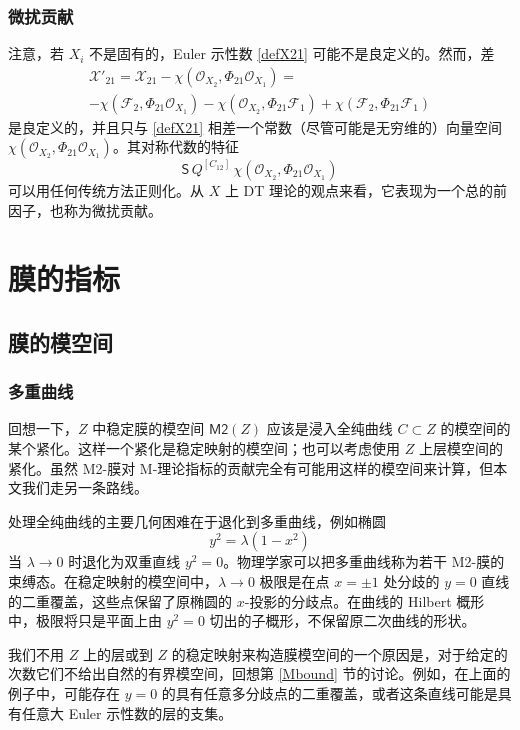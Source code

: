 \documentclass[12pt]{article}
\newcommand{\cO}{\mathscr{O}}
\newcommand{\cF}{\mathscr{F}}
\newcommand{\cX}{\mathscr{X}}
\newcommand{\MM}{\textsf{M2}}
\newcommand{\bS}{\mathsf{S}}
\theoremstyle{definition}
\begin{document}
\subsubsection{微扰贡献}\label{s_pert}

注意，若 $X_i$ 不是固有的，Euler 示性数 \eqref{defX21} 可能不是良定义的。然而，差
\begin{multline}
 \cX'_{21}= \cX_{21} - \chi(\cO_{X_2},\Phi_{21} \cO_{X_1}) =\\
 -\chi(\cF_2,\Phi_{21} \cO_{X_1})
- \chi(\cO_{X_2},  \Phi_{21}  \cF_1)
 +\chi(\cF_2, \Phi_{21} \cF_1)
\label{X21red}
\end{multline}
是良定义的，并且只与 \eqref{defX21} 相差一个常数（尽管可能是无穷维的）向量空间 $\chi(\cO_{X_2},\Phi_{21}
\cO_{X_1})$。其对称代数的特征
$$
\bS \, Q^{[C_{12}]} \, \chi(\cO_{X_2},\Phi_{21}
\cO_{X_1})
$$
可以用任何传统方法正则化。从 $X$ 上 DT 理论的观点来看，它表现为一个总的前因子，也称为微扰贡献。
\section{膜的指标}\label{s_M}

\subsection{膜的模空间}

\subsubsection{多重曲线}

回想一下，$Z$ 中稳定膜的模空间 $\MM(Z)$ 应该是浸入全纯曲线 $C\subset Z$ 的模空间的某个紧化。这样一个紧化是稳定映射的模空间；也可以考虑使用 $Z$ 上层模空间的紧化。虽然 M2-膜对 M-理论指标的贡献完全有可能用这样的模空间来计算，但本文我们走另一条路线。

处理全纯曲线的主要几何困难在于退化到多重曲线，例如椭圆
$$
y^2 = \lambda (1-x^2)
$$
当 $\lambda\to 0$ 时退化为双重直线 $y^2=0$。物理学家可以把多重曲线称为若干 M2-膜的束缚态。在稳定映射的模空间中，$\lambda\to 0$ 极限是在点 $x=\pm 1$ 处分歧的 $y=0$ 直线的二重覆盖，这些点保留了原椭圆的 $x$-投影的分歧点。在曲线的 Hilbert 概形中，极限将只是平面上由 $y^2=0$ 切出的子概形，不保留原二次曲线的形状。

我们不用 $Z$ 上的层或到 $Z$ 的稳定映射来构造膜模空间的一个原因是，对于给定的次数它们不给出自然的有界模空间，回想第 \ref{Mbound} 节的讨论。例如，在上面的例子中，可能存在 $y=0$ 的具有任意多分歧点的二重覆盖，或者这条直线可能是具有任意大 Euler 示性数的层的支集。
\end{document}
